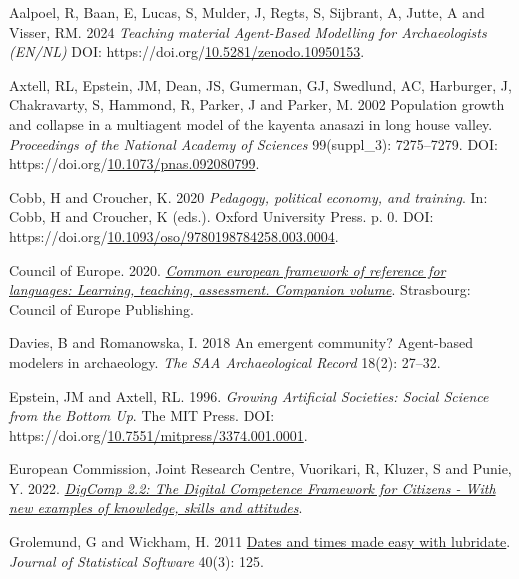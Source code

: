 \documentclass[
]{article}
\newlength{\cslhangindent}
\newlength{\cslentryspacingunit} %
\newenvironment{CSLReferences}[2] %
 {%
  \setlength{\parindent}{0pt}
  \ifodd #1
  \let\oldpar\par
  \def\par{\hangindent=\cslhangindent\oldpar}
  \fi
  \setlength{\parskip}{#2\cslentryspacingunit}
 }%
 {}
\begin{document}
\hypertarget{refs}{}
\begin{CSLReferences}{1}{0}
\leavevmode{}%
Aalpoel, R, Baan, E, Lucas, S, Mulder, J, Regts, S, Sijbrant, A, Jutte, A and Visser, RM. 2024 \emph{Teaching material Agent-Based Modelling for Archaeologists (EN/NL)} DOI: https://doi.org/\href{https://doi.org/10.5281/zenodo.10950153}{10.5281/zenodo.10950153}.

\leavevmode{}%
Axtell, RL, Epstein, JM, Dean, JS, Gumerman, GJ, Swedlund, AC, Harburger, J, Chakravarty, S, Hammond, R, Parker, J and Parker, M. 2002 Population growth and collapse in a multiagent model of the kayenta anasazi in long house valley. \emph{Proceedings of the National Academy of Sciences} 99(suppl{\_}3): 7275--7279. DOI: https://doi.org/\href{https://doi.org/10.1073/pnas.092080799}{10.1073/pnas.092080799}.

\leavevmode{}%
Cobb, H and Croucher, K. 2020 \emph{Pedagogy, political economy, and training}. In: Cobb, H and Croucher, K (eds.). Oxford University Press. p. 0. DOI: https://doi.org/\href{https://doi.org/10.1093/oso/9780198784258.003.0004}{10.1093/oso/9780198784258.003.0004}.

\leavevmode{}%
Council of Europe. 2020. \emph{\href{http://www.coe.int/lang-cefr}{Common european framework of reference for languages: Learning, teaching, assessment. Companion volume}}. Strasbourg: Council of Europe Publishing.

\leavevmode{}%
Davies, B and Romanowska, I. 2018 An emergent community? Agent-based modelers in archaeology. \emph{The SAA Archaeological Record} 18(2): 27--32.

\leavevmode{}%
Epstein, JM and Axtell, RL. 1996. \emph{Growing Artificial Societies: Social Science from the Bottom Up}. The MIT Press. DOI: https://doi.org/\href{https://doi.org/10.7551/mitpress/3374.001.0001}{10.7551/mitpress/3374.001.0001}.

\leavevmode{}%
European Commission, Joint Research Centre, Vuorikari, R, Kluzer, S and Punie, Y. 2022. \emph{\href{https://data.europa.eu/doi/10.2760/115376}{DigComp 2.2: The Digital Competence Framework for Citizens - With new examples of knowledge, skills and attitudes}}.

\leavevmode{}%
Grolemund, G and Wickham, H. 2011 \href{https://www.jstatsoft.org/v40/i03/}{Dates and times made easy with lubridate}. \emph{Journal of Statistical Software} 40(3): 125.


\end{CSLReferences}
\end{document}
